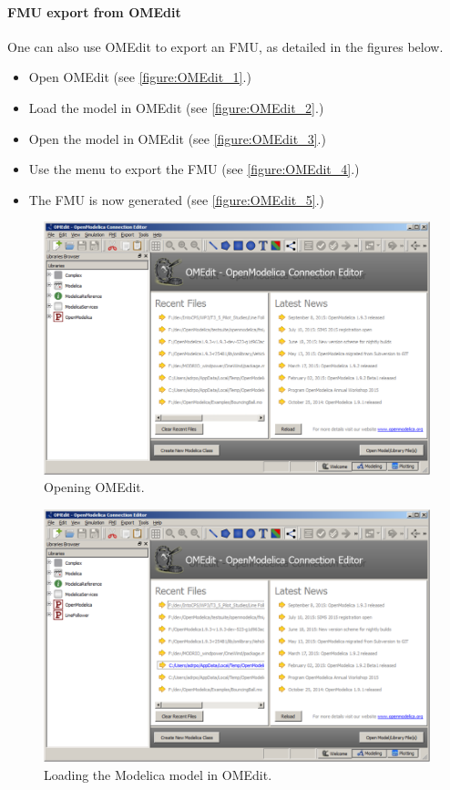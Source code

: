 \paragraph{FMU export from OMEdit}
One can also use OMEdit to export an FMU, as detailed in the figures below.
%
%
%
\begin{itemize}
\item Open OMEdit (see \autoref{figure:OMEdit_1}.)
\item Load the model in OMEdit (see \autoref{figure:OMEdit_2}.)
\item Open the model in OMEdit (see \autoref{figure:OMEdit_3}.)
\item Use the menu to export the FMU (see \autoref{figure:OMEdit_4}.)
\item The FMU is now generated (see \autoref{figure:OMEdit_5}.)
\end{itemize}
%
%
%
\begin{figure}[ht]
	\centerline{\includegraphics[width=12.5cm]{figures/OMEdit_1.png}}
	\caption{Opening OMEdit.}
	\label{figure:OMEdit_1}
\end{figure}
%
%
%
\begin{figure}[ht]
	\centerline{\includegraphics[width=12.5cm]{figures/OMEdit_2.png}}
	\caption{Loading the Modelica model in OMEdit.}
	\label{figure:OMEdit_2}
\end{figure}
